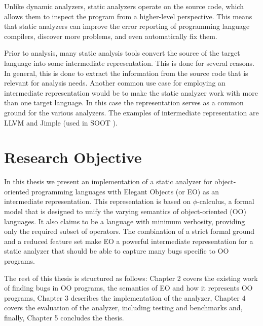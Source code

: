 Unlike dynamic analyzers, static analyzers operate on the source code, which allows them to inspect the program from a higher-level perspective. This means that static analyzers can improve the error reporting of programming language compilers, discover more problems, and  even automatically fix them.

Prior to analysis, many static analysis tools convert the source of the target language into some intermediate representation. This is done for several reasons. In general, this is done to extract the information from the source code that is relevant for analysis needs. Another common use case for employing an intermediate representation would be to
make the static analyzer work with more than one target language. In this case the representation serves as a common ground for the various analyzers. The examples of  intermediate representation are LLVM \cite{llvm} and Jimple \cite{vallee1998jimple} (used in SOOT \cite{vallee2010soot}).

\section{Research Objective}

In this thesis we present an implementation of a static analyzer for object-oriented programming languages with Elegant Objects \cite{eolang} (or EO) as an intermediate representation. This representation is based on $\phi$-calculus, a formal model that is designed to unify the varying semantics of object-oriented (OO) languages. It also claims to be a language with minimum verbosity, providing only the required subset of operators. The combination of a strict formal ground and a reduced feature set make EO a powerful intermediate representation for a static analyzer that should be able to capture many bugs specific to OO programs. 

The rest of this thesis is structured as follows: Chapter 2 covers the existing work of finding bugs in OO programs, the semantics of EO and how it represents OO programs, Chapter 3 describes the implementation of the analyzer, Chapter 4 covers the evaluation of the analyzer, including testing and benchmarks and, finally, Chapter 5 concludes the thesis.
